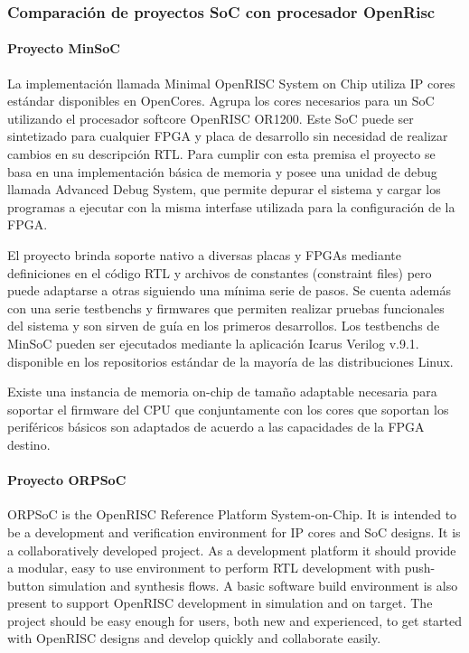 				\subsubsection{Comparación de proyectos SoC con procesador OpenRisc} 
				
				\paragraph{Proyecto MinSoC}
				La implementación llamada Minimal OpenRISC System on Chip utiliza IP cores estándar disponibles en OpenCores. Agrupa los cores necesarios para un
				SoC utilizando el procesador softcore OpenRISC OR1200. Este SoC puede ser sintetizado para cualquier FPGA y placa de desarrollo sin necesidad de
				realizar cambios en su descripción RTL. Para cumplir con esta premisa el proyecto se basa en una implementación básica de memoria y posee una
				unidad de debug llamada Advanced Debug System, que permite depurar el sistema y cargar los programas a ejecutar con la misma interfase utilizada
				para la configuración de la FPGA.
				
				El proyecto brinda soporte nativo a diversas placas y FPGAs mediante definiciones en el código RTL y archivos de constantes (constraint files)
				pero puede adaptarse a otras siguiendo una mínima serie de pasos. Se cuenta además con una serie testbenchs y firmwares que permiten realizar
				pruebas funcionales del sistema y son sirven de guía en los primeros desarrollos. Los testbenchs de MinSoC pueden ser ejecutados mediante la
				aplicación Icarus Verilog v.9.1. disponible en los repositorios estándar de la mayoría de las distribuciones Linux. 
				
				Existe una instancia de memoria on-chip de tamaño adaptable necesaria para soportar el firmware del CPU que conjuntamente con los cores que
				soportan los periféricos básicos son adaptados de acuerdo a las capacidades de la FPGA destino. 
				
				\paragraph{Proyecto ORPSoC}
				ORPSoC is the OpenRISC Reference Platform System-on-Chip. It is intended to be a development and verification environment for IP cores and SoC
				designs. It is a collaboratively developed project.
                As a development platform it should provide a modular, easy to use environment to perform RTL development with push-button simulation
                and synthesis flows. A basic software build environment is also present to support OpenRISC development in simulation and on target.
                The project should be easy enough for users, both new and experienced, to get started with OpenRISC designs and develop quickly and
                collaborate easily.
				
